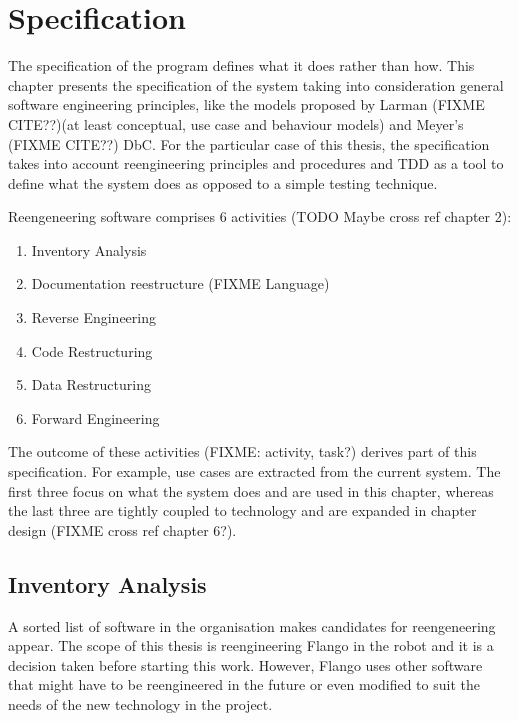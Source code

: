 \chapter{Specification}
The specification of the program defines what it does rather than how.
This chapter presents the specification of the system taking into consideration general software engineering principles, like the models proposed by Larman (FIXME CITE??)(at least conceptual, use case and behaviour models) and Meyer's (FIXME CITE??) \ac{DbC}.
For the particular case of this thesis, the specification takes into account reengineering principles and procedures and \ac{TDD} as a tool to define what the system does as opposed to a simple testing technique.

Reengeneering software comprises 6 activities (TODO Maybe cross ref chapter 2): 
\begin{enumerate}
    \item Inventory Analysis
    \item Documentation reestructure (FIXME Language)
    \item Reverse Engineering
    \item Code Restructuring
    \item Data Restructuring
    \item Forward Engineering
\end{enumerate}   
   
The outcome of these activities (FIXME: activity, task?) derives part of this specification.
For example, use cases are extracted from the current system.
The first three focus on what the system does and are used in this chapter, whereas the last three are tightly coupled to technology and are expanded in chapter design (FIXME cross ref chapter 6?).

\section{Inventory Analysis}
A sorted list of software in the organisation makes candidates for reengeneering appear.
The scope of this thesis is reengineering Flango in the robot and it is a decision taken before starting this work.
However, Flango uses other software that might have to be reengineered in the future or even modified to suit the needs of the new technology in the project.

